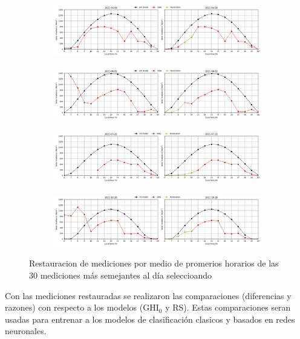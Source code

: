 \begin{figure}[H]
  \centering
  \begin{subfigure}{15cm}
    \includegraphics[width=15cm]{Graphics/2021-04-09.png}
  \end{subfigure}
  \begin{subfigure}{15cm}
    \includegraphics[width=15cm]{Graphics/2021-06-02.png}
  \end{subfigure}
  \begin{subfigure}{15cm}
    \includegraphics[width=15cm]{Graphics/2021-07-22.png}
  \end{subfigure}
  \begin{subfigure}{15cm}
    \includegraphics[width=15cm]{Graphics/2021-10-26.png}
  \end{subfigure}
  \caption{Restauracion de mediciones por medio de promerios horarios de las 30 mediciones más semejantes al día seleccioando}
  \label{fig:restoration}
\end{figure}

Con las mediciones restauradas se realizaron las comparaciones (diferencias y razones) con respecto a los modelos (GHI$_0$ y RS). Estas comparaciones seran usadas para entrenar a los modelos de clasificación clasicos y basados en redes neuronales.

